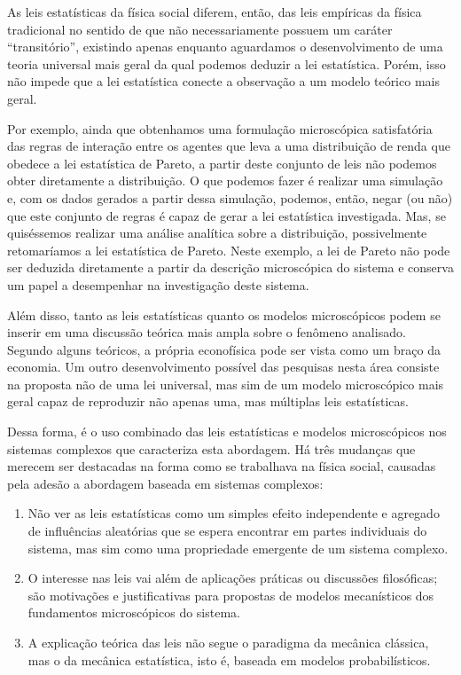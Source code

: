 As leis estatísticas da física social diferem, então, das leis empíricas  da física tradicional no sentido de que não necessariamente possuem um caráter ``transitório'', existindo apenas enquanto aguardamos o desenvolvimento de uma teoria universal mais geral da qual podemos deduzir a lei estatística. Porém, isso não impede que a lei estatística conecte a observação a um modelo teórico mais geral. 

Por exemplo, ainda que obtenhamos uma formulação microscópica satisfatória das regras de interação entre os agentes que leva a uma distribuição de renda que obedece a lei estatística de Pareto, a partir deste conjunto de leis não podemos obter diretamente a distribuição. O que podemos fazer é realizar uma simulação e, com os dados gerados a partir dessa simulação, podemos, então, negar (ou não) que este conjunto de regras é capaz de gerar a lei estatística investigada. Mas, se quiséssemos realizar uma análise analítica sobre a distribuição, possivelmente retomaríamos a lei estatística de Pareto. Neste exemplo, a lei de Pareto não pode ser deduzida diretamente a partir da descrição microscópica do sistema  e conserva um papel a desempenhar na investigação deste sistema. 

Além disso, tanto as leis estatísticas quanto os modelos microscópicos podem se inserir em uma discussão teórica mais ampla sobre o fenômeno analisado. Segundo alguns teóricos, a própria econofísica  pode ser vista como um braço da economia. Um outro desenvolvimento possível das pesquisas nesta área consiste na proposta não de uma lei universal, mas sim de um modelo  microscópico mais geral capaz de reproduzir não apenas uma, mas múltiplas leis estatísticas.

Dessa forma, é o uso combinado das leis estatísticas e modelos microscópicos nos sistemas complexos que caracteriza esta abordagem. Há três mudanças que merecem ser destacadas na forma como se trabalhava na física social, causadas pela adesão a abordagem baseada em sistemas complexos:

\begin{enumerate} 
    \item Não ver as leis estatísticas como um simples efeito independente e agregado de influências aleatórias que se espera encontrar em partes individuais do sistema, mas sim como uma propriedade emergente de um sistema complexo. 
    \item O interesse nas leis vai além de aplicações práticas ou discussões filosóficas; são motivações e justificativas para propostas de modelos mecanísticos dos fundamentos microscópicos do sistema. 
    \item A explicação teórica das leis não segue o paradigma da mecânica clássica, mas o da mecânica estatística, isto é, baseada em modelos probabilísticos. 
\end{enumerate}

